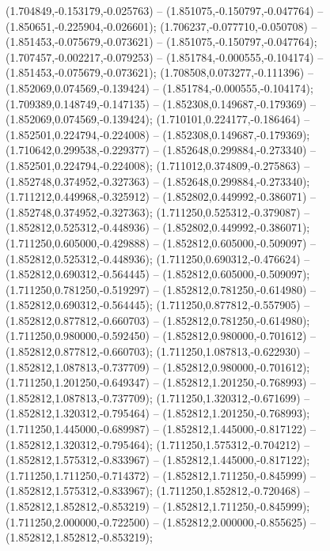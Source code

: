  (1.704849,-0.153179,-0.025763) -- (1.851075,-0.150797,-0.047764) -- (1.850651,-0.225904,-0.026601);
 (1.706237,-0.077710,-0.050708) -- (1.851453,-0.075679,-0.073621) -- (1.851075,-0.150797,-0.047764);
 (1.707457,-0.002217,-0.079253) -- (1.851784,-0.000555,-0.104174) -- (1.851453,-0.075679,-0.073621);
 (1.708508,0.073277,-0.111396) -- (1.852069,0.074569,-0.139424) -- (1.851784,-0.000555,-0.104174);
 (1.709389,0.148749,-0.147135) -- (1.852308,0.149687,-0.179369) -- (1.852069,0.074569,-0.139424);
 (1.710101,0.224177,-0.186464) -- (1.852501,0.224794,-0.224008) -- (1.852308,0.149687,-0.179369);
 (1.710642,0.299538,-0.229377) -- (1.852648,0.299884,-0.273340) -- (1.852501,0.224794,-0.224008);
 (1.711012,0.374809,-0.275863) -- (1.852748,0.374952,-0.327363) -- (1.852648,0.299884,-0.273340);
 (1.711212,0.449968,-0.325912) -- (1.852802,0.449992,-0.386071) -- (1.852748,0.374952,-0.327363);
 (1.711250,0.525312,-0.379087) -- (1.852812,0.525312,-0.448936) -- (1.852802,0.449992,-0.386071);
 (1.711250,0.605000,-0.429888) -- (1.852812,0.605000,-0.509097) -- (1.852812,0.525312,-0.448936);
 (1.711250,0.690312,-0.476624) -- (1.852812,0.690312,-0.564445) -- (1.852812,0.605000,-0.509097);
 (1.711250,0.781250,-0.519297) -- (1.852812,0.781250,-0.614980) -- (1.852812,0.690312,-0.564445);
 (1.711250,0.877812,-0.557905) -- (1.852812,0.877812,-0.660703) -- (1.852812,0.781250,-0.614980);
 (1.711250,0.980000,-0.592450) -- (1.852812,0.980000,-0.701612) -- (1.852812,0.877812,-0.660703);
 (1.711250,1.087813,-0.622930) -- (1.852812,1.087813,-0.737709) -- (1.852812,0.980000,-0.701612);
 (1.711250,1.201250,-0.649347) -- (1.852812,1.201250,-0.768993) -- (1.852812,1.087813,-0.737709);
 (1.711250,1.320312,-0.671699) -- (1.852812,1.320312,-0.795464) -- (1.852812,1.201250,-0.768993);
 (1.711250,1.445000,-0.689987) -- (1.852812,1.445000,-0.817122) -- (1.852812,1.320312,-0.795464);
 (1.711250,1.575312,-0.704212) -- (1.852812,1.575312,-0.833967) -- (1.852812,1.445000,-0.817122);
 (1.711250,1.711250,-0.714372) -- (1.852812,1.711250,-0.845999) -- (1.852812,1.575312,-0.833967);
 (1.711250,1.852812,-0.720468) -- (1.852812,1.852812,-0.853219) -- (1.852812,1.711250,-0.845999);
 (1.711250,2.000000,-0.722500) -- (1.852812,2.000000,-0.855625) -- (1.852812,1.852812,-0.853219);
